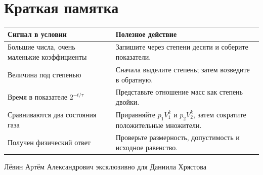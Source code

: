 \documentclass[a4paper,12pt]{article}
\newcommand{\sect}[1]{\section{#1}\vspace{-0.35em}\noindent{\color{accent}\rule{\linewidth}{0.45pt}}\vspace{0.25em}}
\begin{document}
\vspace{12mm}
\sect{Краткая памятка}
\begin{tabularx}{\linewidth}{@{}>{\raggedright\arraybackslash}p{.36\linewidth}X@{}}
\toprule
Сигнал в условии & Полезное действие \\
\midrule
Большие числа, очень маленькие коэффициенты & Запишите через степени десяти и соберите показатели. \\
Величина под степенью & Сначала выделите степень; затем возведите в обратную. \\
Время в показателе $2^{-t/\tau}$ & Представьте отношение масс как степень двойки. \\
Сравниваются два состояния газа & Приравняйте $p_1V_1^k$ и $p_2V_2^k$, затем сократите положительные множители. \\
Получен физический ответ & Проверьте размерность, допустимость и исходное равенство. \\
\bottomrule
\end{tabularx}

\vfill
\begin{center}
{\small\color{quiet} Лёвин Артём Александрович эксклюзивно для Даниила Хрястова}
\end{center}
\end{document}
